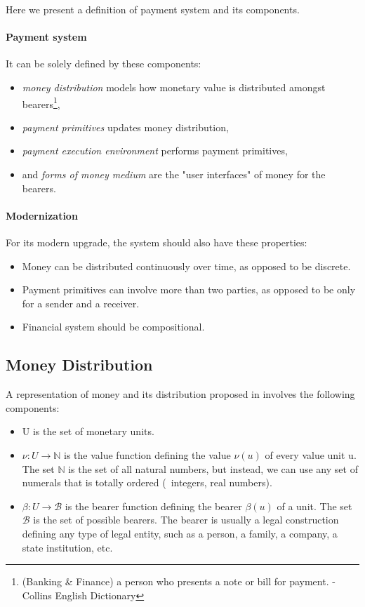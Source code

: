 Here we present a definition of payment system and its components.

\paragraph{Payment system}

It can be solely defined by these components:

\begin{itemize}
\item \textit{money distribution} models how monetary value is distributed amongst bearers\footnote{(Banking \& Finance)
a person who presents a note or bill for payment. - Collins English Dictionary},
\item \textit{payment primitives} updates money distribution,
\item \textit{payment execution environment} performs payment primitives,
\item and \textit{forms of money medium} are the "user interfaces" of money for the bearers.
\end{itemize}

\paragraph{Modernization}

For its modern upgrade, the system should also have these properties:

\begin{itemize}
\item Money can be distributed continuously over time, as opposed to be discrete.
\item Payment primitives can involve more than two parties, as opposed to be only for a sender and a receiver.
\item Financial system should be compositional.
\end{itemize}


\subsection{Money Distribution}

A representation of money and its distribution proposed in \cite{buldas2021unifying} involves the following components:

\begin{itemize}
\item U is the set of monetary units.
\item $\nu : U \rightarrow \mathbb{N}$ is the value function defining the value $\nu(u)$ of every value unit u. The set
    $\mathbb{N}$ is the set of all natural numbers, but instead, we can use any set of numerals that is totally ordered
    (\eg\ integers, real numbers).
\item $\beta : U \rightarrow \mathcal{B}$ is the bearer function defining the bearer $\beta(u)$ of a unit. The set
    $\mathcal{B}$ is the set of possible bearers. The bearer is usually a legal construction defining any type of legal
    entity, such as a person, a family, a company, a state institution, etc.
\end{itemize}

